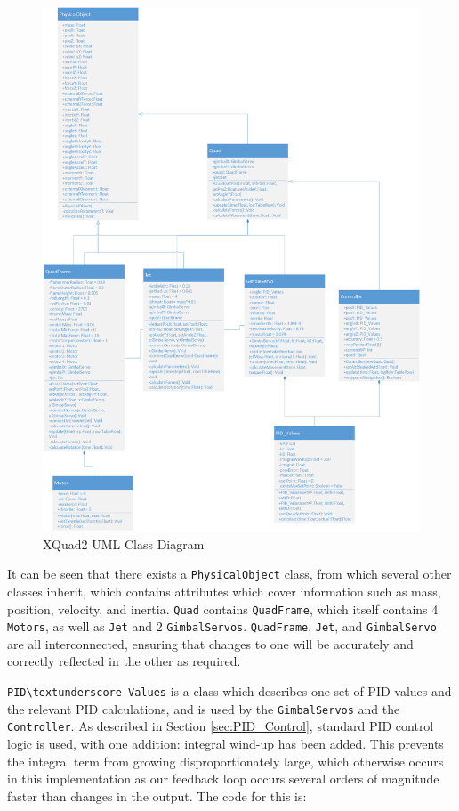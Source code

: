 \documentclass[11pt]{article}
\begin{document}
\begin{figure}
    \includegraphics[width=\linewidth]{XQuad_2_Class_Diagram}
    \caption{XQuad2 UML Class Diagram}
    \label{fig:XQuad_2_Class_Diagram}
\end{figure}

It can be seen that there exists a \lstinline|PhysicalObject| class, from which several other classes inherit, which contains attributes which cover information such as mass, position, velocity, and inertia. \lstinline|Quad| contains \lstinline|QuadFrame|, which itself contains 4 \lstinline|Motors|, as well as \lstinline|Jet| and 2 \lstinline|GimbalServos|. \lstinline|QuadFrame|, \lstinline|Jet|, and \lstinline|GimbalServo| are all interconnected, ensuring that changes to one will be accurately and correctly reflected in the other as required.

\lstinline|PID\textunderscore Values| is a class which describes one set of PID values and the relevant PID calculations, and is used by the \lstinline|GimbalServos| and the \lstinline|Controller|. As described in Section \ref{sec:PID_Control}, standard PID control logic is used, with one addition: integral wind-up has been added. This prevents the integral term from growing disproportionately large, which otherwise occurs in this implementation as our feedback loop occurs several orders of magnitude faster than changes in the output. The code for this is:
\end{document}
